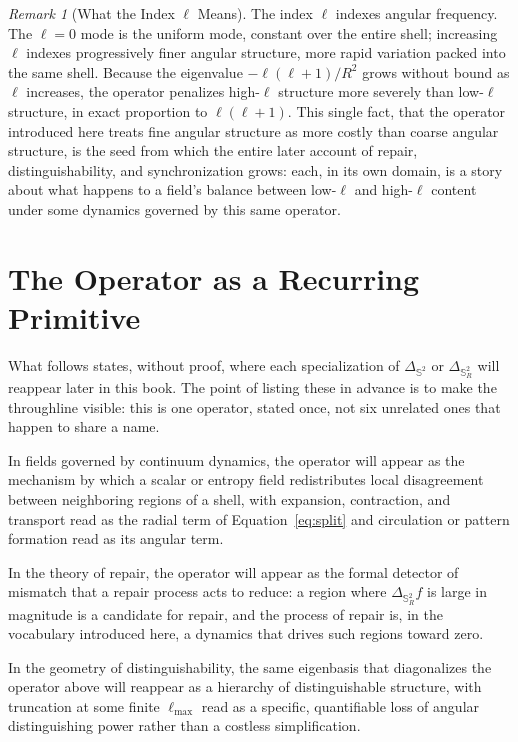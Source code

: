 \documentclass[11pt,fleqn]{book}
\numberwithin{equation}{chapter}
\theoremstyle{plain}
\theoremstyle{definition}
\theoremstyle{remark}
\newtheorem{remark}[theorem]{Remark}
\newcommand{\Sphere}{\mathbb{S}^{2}}
\begin{document}
\begin{remark}[What the Index \texorpdfstring{\(\ell\)}{ell} Means]
The index \(\ell\) indexes angular frequency. The \(\ell=0\) mode is the uniform mode, constant over the entire shell; increasing \(\ell\) indexes progressively finer angular structure, more rapid variation packed into the same shell. Because the eigenvalue \(-\ell(\ell+1)/R^2\) grows without bound as \(\ell\) increases, the operator penalizes high-\(\ell\) structure more severely than low-\(\ell\) structure, in exact proportion to \(\ell(\ell+1)\). This single fact, that the operator introduced here treats fine angular structure as more costly than coarse angular structure, is the seed from which the entire later account of repair, distinguishability, and synchronization grows: each, in its own domain, is a story about what happens to a field's balance between low-\(\ell\) and high-\(\ell\) content under some dynamics governed by this same operator.
\end{remark}

\section{The Operator as a Recurring Primitive}

What follows states, without proof, where each specialization of \(\Delta_{\Sphere}\) or \(\Delta_{\Sphere_R}\) will reappear later in this book. The point of listing these in advance is to make the throughline visible: this is one operator, stated once, not six unrelated ones that happen to share a name.

In fields governed by continuum dynamics, the operator will appear as the mechanism by which a scalar or entropy field redistributes local disagreement between neighboring regions of a shell, with expansion, contraction, and transport read as the radial term of Equation~\eqref{eq:split} and circulation or pattern formation read as its angular term.

In the theory of repair, the operator will appear as the formal detector of mismatch that a repair process acts to reduce: a region where \(\Delta_{\Sphere_R}f\) is large in magnitude is a candidate for repair, and the process of repair is, in the vocabulary introduced here, a dynamics that drives such regions toward zero.

In the geometry of distinguishability, the same eigenbasis that diagonalizes the operator above will reappear as a hierarchy of distinguishable structure, with truncation at some finite \(\ell_{\max}\) read as a specific, quantifiable loss of angular distinguishing power rather than a costless simplification.
\end{document}
